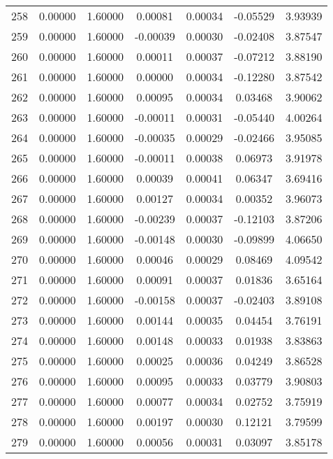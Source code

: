 \begin{longtable}{c c c c c c c}
258 &  0.00000 &      1.60000 &  0.00081 &   0.00034 &  -0.05529 &   3.93939 \\
259 &  0.00000 &      1.60000 & -0.00039 &   0.00030 &  -0.02408 &   3.87547 \\
260 &  0.00000 &      1.60000 &  0.00011 &   0.00037 &  -0.07212 &   3.88190 \\
261 &  0.00000 &      1.60000 &  0.00000 &   0.00034 &  -0.12280 &   3.87542 \\
262 &  0.00000 &      1.60000 &  0.00095 &   0.00034 &   0.03468 &   3.90062 \\
263 &  0.00000 &      1.60000 & -0.00011 &   0.00031 &  -0.05440 &   4.00264 \\
264 &  0.00000 &      1.60000 & -0.00035 &   0.00029 &  -0.02466 &   3.95085 \\
265 &  0.00000 &      1.60000 & -0.00011 &   0.00038 &   0.06973 &   3.91978 \\
266 &  0.00000 &      1.60000 &  0.00039 &   0.00041 &   0.06347 &   3.69416 \\
267 &  0.00000 &      1.60000 &  0.00127 &   0.00034 &   0.00352 &   3.96073 \\
268 &  0.00000 &      1.60000 & -0.00239 &   0.00037 &  -0.12103 &   3.87206 \\
269 &  0.00000 &      1.60000 & -0.00148 &   0.00030 &  -0.09899 &   4.06650 \\
270 &  0.00000 &      1.60000 &  0.00046 &   0.00029 &   0.08469 &   4.09542 \\
271 &  0.00000 &      1.60000 &  0.00091 &   0.00037 &   0.01836 &   3.65164 \\
272 &  0.00000 &      1.60000 & -0.00158 &   0.00037 &  -0.02403 &   3.89108 \\
273 &  0.00000 &      1.60000 &  0.00144 &   0.00035 &   0.04454 &   3.76191 \\
274 &  0.00000 &      1.60000 &  0.00148 &   0.00033 &   0.01938 &   3.83863 \\
275 &  0.00000 &      1.60000 &  0.00025 &   0.00036 &   0.04249 &   3.86528 \\
276 &  0.00000 &      1.60000 &  0.00095 &   0.00033 &   0.03779 &   3.90803 \\
277 &  0.00000 &      1.60000 &  0.00077 &   0.00034 &   0.02752 &   3.75919 \\
278 &  0.00000 &      1.60000 &  0.00197 &   0.00030 &   0.12121 &   3.79599 \\
279 &  0.00000 &      1.60000 &  0.00056 &   0.00031 &   0.03097 &   3.85178 \\

\end{longtable}

